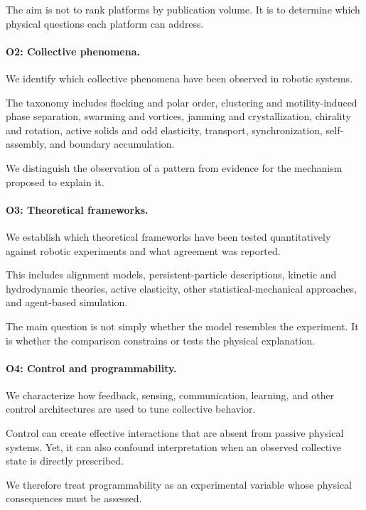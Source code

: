 The aim is not
to rank platforms
by publication
volume.
It is to
determine which
physical questions
each platform
can address.

\paragraph*{O2: Collective phenomena.}

We identify which collective phenomena
have been observed
in robotic systems.

The taxonomy
includes flocking
and polar order,
clustering and
motility-induced
phase separation,
swarming and vortices,
jamming and
crystallization,
chirality and
rotation,
active solids
and odd elasticity,
transport,
synchronization,
self-assembly,
and boundary
accumulation.

We distinguish
the observation
of a pattern
from evidence
for the
mechanism proposed
to explain it.

\paragraph*{O3: Theoretical frameworks.}

We establish which theoretical frameworks
have been tested quantitatively
against robotic experiments
and what agreement
was reported.

This includes
alignment models,
persistent-particle
descriptions,
kinetic and
hydrodynamic theories,
active elasticity,
other statistical-mechanical
approaches,
and agent-based
simulation.

The main question
is not simply
whether the model
resembles the
experiment.
It is whether
the comparison
constrains or
tests the
physical explanation.

\paragraph*{O4: Control and programmability.}

We characterize how feedback,
sensing, communication,
learning, and
other control
architectures are
used to tune
collective behavior.

Control can create
effective interactions
that are absent
from passive
physical systems.
Yet, it can
also confound
interpretation
when an observed
collective state
is directly
prescribed.

We therefore
treat programmability
as an experimental
variable whose
physical consequences
must be assessed.

